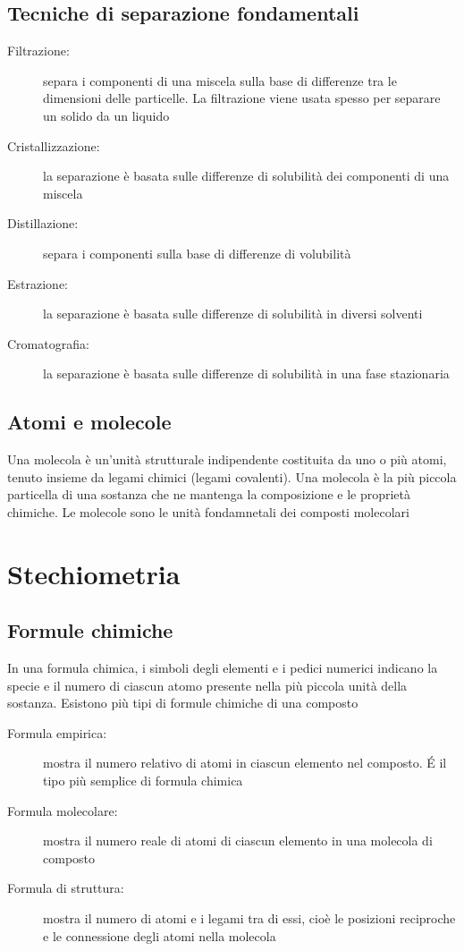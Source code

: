 \documentclass[a4paper,11pt]{report}
\begin{document}
\section{Tecniche di separazione fondamentali}

\begin{description}
	\item[Filtrazione:] separa i componenti di una miscela sulla base di differenze tra le dimensioni delle particelle. La filtrazione viene usata spesso per separare un solido da un liquido 
 \item[Cristallizzazione:] la separazione è basata sulle differenze di solubilità dei componenti di una miscela 
 \item[Distillazione:] separa i componenti sulla base di differenze di volubilità 
 \item[Estrazione:] la separazione è basata sulle differenze di solubilità in diversi solventi
 \item[Cromatografia:] la separazione è basata sulle differenze di solubilità in una fase stazionaria     
\end{description}

\section{Atomi e molecole}
Una molecola è un'unità strutturale indipendente costituita da uno o più atomi, tenuto insieme da legami chimici (legami covalenti). Una molecola è la più piccola particella di una sostanza che ne mantenga la composizione e le proprietà chimiche. Le molecole sono le unità fondamnetali dei composti molecolari

\chapter{Stechiometria}

\section{Formule chimiche}
In una formula chimica, i simboli degli elementi e i pedici numerici indicano la specie e il numero di ciascun atomo presente nella più piccola unità della sostanza. Esistono più tipi di formule chimiche di una composto

\begin{description}
	\item[Formula empirica:] mostra il numero relativo di atomi in ciascun elemento nel composto. \'E il tipo più semplice di formula chimica
 \item[Formula molecolare:] mostra il numero reale di atomi di ciascun elemento in una molecola di composto
 \item[Formula di struttura:] mostra il numero di atomi e i legami tra di essi, cioè le posizioni reciproche e le connessione degli atomi nella molecola    
\end{description}
\end{document}
